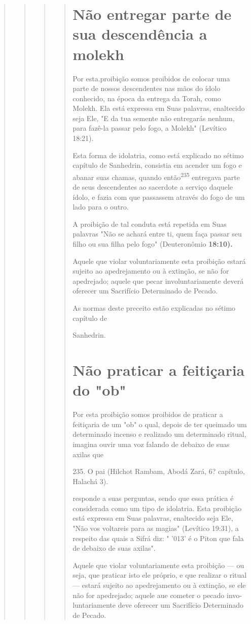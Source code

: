 \begin{quote}
\begin{quote}
\begin{quote}
\begin{quote}
\section{Não entregar parte de sua descendência a molekh}

Por esta.proibição somos proibidos de colocar uma parte de nossos
descendentes nas mãos do ídolo conhecido, na época da entrega da Torah,
co­mo Molekh. Ela está expressa em Suas palavras, enaltecido seja Ele,
"E da tua semente não entregarás nenhum, para fazê-la passar pelo fogo,
a Molekh" (Le­vítico 18:21).

Esta forma de idolatria, como está explicado no sétimo capítulo de
Sanhedrin, consistia em acender um fogo e abanar suas chamas, quando
então\textsuperscript{235} entregava parte de seus descendentes ao
sacerdote a serviço daquele ídolo, e fazia com que passassem através do
fogo de um lado para o outro.

A proibição de tal conduta está repetida em Suas palavras "Não se achará
entre ti, quem faça passar seu filho ou sua filha pelo fogo"
(Deuteronô­mio \textbf{18:10).}

Aquele que violar voluntariamente esta proibição estará sujeito ao
apedrejamento ou à extinção, se não for apedrejado; aquele que pecar
involun­tariamente deverá oferecer um Sacrifício Determinado de Pecado.

As normas deste preceito estão explicadas no sétimo capítulo de

Sanhedrin.

\section{Não praticar a feitiçaria do "ob"}


Por esta proibição somos proibidos de praticar a feitiçaria de um "ob" o
qual, depois de ter queimado um determinado incenso e realizado um
deter­minado ritual, imagina ouvir uma voz falando de debaixo de suas
axilas que

235. O pai (Hilchot Rambam, Abodá Zará, 6? capítulo, Halachá 3).


responde a suas perguntas, sendo que essa prática é considerada como um
tipo de idolatria. Esta proibição está expressa em Suas palavras,
enaltecido seja Ele, "Não vos voltareis para as magias" (Levítico
19:31), a respeito das quais a Sifrá diz: " '013' é o Piton que fala de
debaixo de suas axilas".

Aquele que violar voluntariamente esta proibição --- ou seja, que
pra­ticar isto ele próprio, e que realizar o ritual --- estará sujeito
ao apedrejamento ou à extinção, se ele não for apedrejado; aquele aue
cometer o pecado invo­luntariamente deve oferecer um Sacrifício
Determinado de Pecado.
\end{quote}


\end{quote}
\end{quote}
\end{quote}
